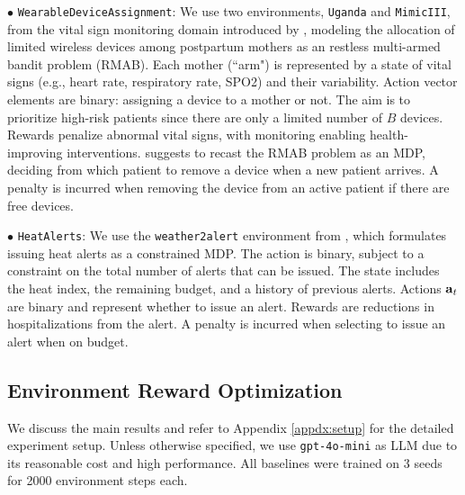 $\bullet$ \texttt{WearableDeviceAssignment}: We use two environments, \texttt{Uganda} and \texttt{MimicIII}, from the vital sign monitoring domain introduced by \citet{boehmer2024optimizing}, modeling the allocation of limited wireless devices among postpartum mothers as an restless multi-armed bandit problem (RMAB). Each mother (``arm") is represented by a state of vital signs (e.g., heart rate, respiratory rate, SPO2) and their variability. Action vector elements are binary: assigning a device to a mother or not. The aim is to prioritize high-risk patients since there are only a limited number of $B$ devices. Rewards penalize abnormal vital signs, with monitoring enabling health-improving interventions.
 \citet{boehmer2024optimizing} suggests to recast the RMAB problem as an MDP, deciding from which patient to remove a device when a new patient arrives.  A penalty is incurred when removing the device from an active patient if there are free devices.

$\bullet$ \texttt{HeatAlerts}: We use the \texttt{weather2alert} environment from \citet{considine2023optimizing}
, which formulates issuing heat alerts as a constrained MDP. The action is binary, subject to a constraint on the total number of alerts that can be issued. The state includes the heat index, the remaining budget, and a history of previous alerts. Actions ${\mathbf{a}}_t$ are binary and represent whether to issue an alert. Rewards are reductions in hospitalizations from the alert. A penalty is incurred when selecting to issue an alert when on budget. 

\subsection{Environment Reward Optimization}

We discuss the main results and refer to Appendix \ref{appdx:setup} for the detailed experiment setup. Unless otherwise specified, we use \texttt{gpt-4o-mini} \cite{openai2024gpt4omini} as LLM due to its reasonable cost and high performance. All baselines were trained on 3 seeds for 2000 environment steps each. 

